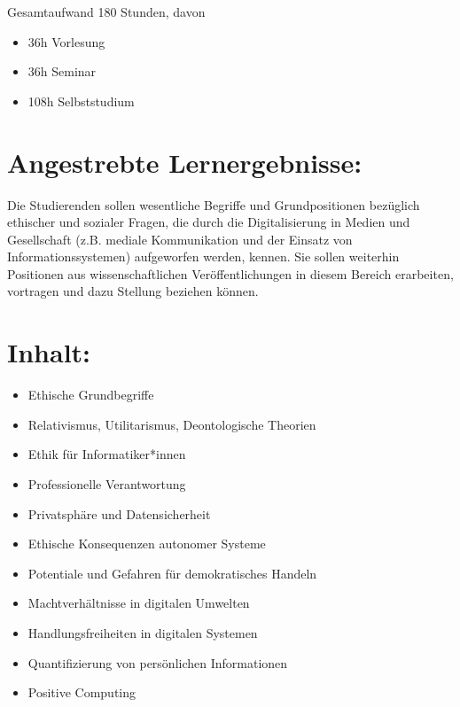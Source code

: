 Gesamtaufwand 180 Stunden, davon

\begin{itemize}
\tightlist
\item
  36h Vorlesung
\item
  36h Seminar
\item
  108h Selbststudium
\end{itemize}

\section*{Angestrebte
Lernergebnisse:\label{/mi-2017/modulbeschreibungen-master/MA_All_Computerethik}}\label{angestrebte-lernergebnissepathlabelmi-2017modulbeschreibungen-mastermaux5fallux5fcomputerethik}

Die Studierenden sollen wesentliche Begriffe und Grundpositionen
bezüglich ethischer und sozialer Fragen, die durch die Digitalisierung
in Medien und Gesellschaft (z.B. mediale Kommunikation und der Einsatz
von Informationssystemen) aufgeworfen werden, kennen. Sie sollen
weiterhin Positionen aus wissenschaftlichen Veröffentlichungen in diesem
Bereich erarbeiten, vortragen und dazu Stellung beziehen können.

\section*{Inhalt:\label{/mi-2017/modulbeschreibungen-master/MA_All_Computerethik}}\label{inhaltpathlabelmi-2017modulbeschreibungen-mastermaux5fallux5fcomputerethik}

\begin{itemize}
\tightlist
\item
  Ethische Grundbegriffe
\item
  Relativismus, Utilitarismus, Deontologische Theorien
\item
  Ethik für Informatiker*innen
\item
  Professionelle Verantwortung
\item
  Privatsphäre und Datensicherheit
\item
  Ethische Konsequenzen autonomer Systeme
\item
  Potentiale und Gefahren für demokratisches Handeln
\item
  Machtverhältnisse in digitalen Umwelten
\item
  Handlungsfreiheiten in digitalen Systemen
\item
  Quantifizierung von persönlichen Informationen
\item
  Positive Computing
\end{itemize}

